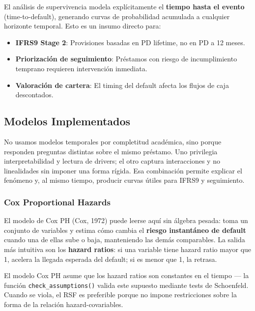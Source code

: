 \documentclass[
  spanish,
  11pt,
  letterpaper,
]{scrbook}
\providecommand{\tightlist}{%
  \setlength{\itemsep}{0pt}\setlength{\parskip}{0pt}}
\theoremstyle{plain}
\theoremstyle{remark}
\begin{document}
El análisis de supervivencia modela explícitamente el \textbf{tiempo
hasta el evento} (time-to-default), generando curvas de probabilidad
acumulada a cualquier horizonte temporal. Esto es un insumo directo
para:

\begin{itemize}
\tightlist
\item
  \textbf{IFRS9 Stage 2}: Provisiones basadas en PD lifetime, no en PD a
  12 meses.
\item
  \textbf{Priorización de seguimiento}: Préstamos con riesgo de
  incumplimiento temprano requieren intervención inmediata.
\item
  \textbf{Valoración de cartera}: El timing del default afecta los
  flujos de caja descontados.
\end{itemize}

\subsection{Modelos Implementados}\label{modelos-implementados}

No usamos modelos temporales por completitud académica, sino porque
responden preguntas distintas sobre el mismo préstamo. Uno privilegia
interpretabilidad y lectura de drivers; el otro captura interacciones y
no linealidades sin imponer una forma rígida. Esa combinación permite
explicar el fenómeno y, al mismo tiempo, producir curvas útiles para
IFRS9 y seguimiento.

\subsubsection{Cox Proportional Hazards}\label{cox-proportional-hazards}

El modelo de Cox PH (Cox, 1972) puede leerse aquí sin álgebra pesada:
toma un conjunto de variables y estima cómo cambia el \textbf{riesgo
instantáneo de default} cuando una de ellas sube o baja, manteniendo las
demás comparables. La salida más intuitiva son los \textbf{hazard
ratios}: si una variable tiene hazard ratio mayor que 1, acelera la
llegada esperada del default; si es menor que 1, la retrasa.

\begin{tcolorbox}[enhanced jigsaw, arc=.35mm, bottomrule=.15mm, bottomtitle=1mm, breakable, colback=white, colbacktitle=quarto-callout-note-color!10!white, colframe=quarto-callout-note-color-frame, coltitle=black, left=2mm, leftrule=.75mm, opacityback=0, opacitybacktitle=0.6, rightrule=.15mm, title=\textcolor{quarto-callout-note-color}{\faInfo}\hspace{0.5em}{Supuesto de proporcionalidad}, titlerule=0mm, toprule=.15mm, toptitle=1mm]

El modelo Cox PH asume que los hazard ratios son constantes en el tiempo
--- la función \texttt{check\_assumptions()} valida este supuesto
mediante tests de Schoenfeld. Cuando se viola, el RSF es preferible
porque no impone restricciones sobre la forma de la relación
hazard-covariables.

\end{tcolorbox}
\end{document}
